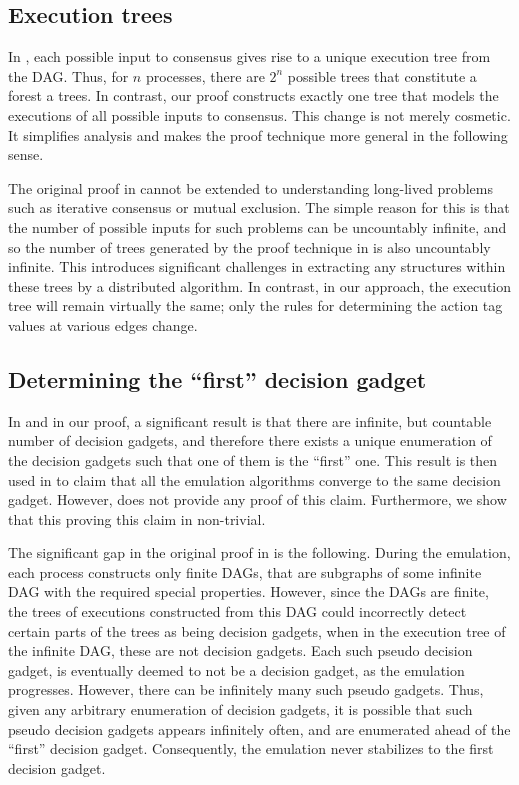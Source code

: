 \documentclass[11pt]{article}
\numberwithin{theorem}{section}
\begin{document}
\subsection{Execution trees}
In \cite{chan:twfdf}, each possible input to consensus gives rise to a unique execution tree from the DAG. Thus, for $n$ processes, there are $2^n$ possible trees that constitute a forest a trees. In contrast, our proof constructs exactly one tree that models the executions of all possible inputs to consensus. This change is not merely cosmetic. It simplifies analysis and makes the proof technique more general in the following sense.

The original proof in \cite{chan:twfdf} cannot be extended to understanding long-lived problems such as iterative consensus or mutual exclusion. The simple reason for this is that the number of possible inputs for such problems can be uncountably infinite, and so the number of trees generated by the proof technique in \cite{chan:twfdf} is also uncountably infinite. This introduces significant challenges in extracting any structures within these trees by a distributed algorithm. In contrast, in our approach, the execution tree will remain virtually the same; only the rules for determining the action tag values at various edges change.

\subsection{Determining the ``first'' decision gadget}
In \cite{chan:twfdf} and in our proof, a significant result is that there are infinite, but countable number of decision gadgets, and therefore there exists a unique enumeration of the decision gadgets such that one of them is the ``first'' one. This result is then used in \cite{chan:twfdf}  to claim that all the emulation algorithms converge to the same decision gadget. However, \cite{chan:twfdf} does not provide any proof of this claim. Furthermore, we show that this proving this claim in non-trivial.

The significant gap in the original proof in \cite{chan:twfdf} is the following. During the emulation, each process constructs only finite DAGs, that are subgraphs of some infinite DAG with the required special properties. However, since the DAGs are finite, the trees of executions constructed from this DAG could incorrectly detect certain parts of the trees as being decision gadgets, when in the execution tree of the infinite DAG, these are not decision gadgets. Each such pseudo decision gadget, is eventually deemed to not be a decision gadget, as the emulation progresses. However, there can be infinitely many such pseudo gadgets. Thus, given any arbitrary enumeration of decision gadgets, it is possible that such pseudo decision gadgets appears infinitely often, and are enumerated ahead of the ``first'' decision gadget. Consequently, the emulation never stabilizes to the first decision gadget.
\end{document}
